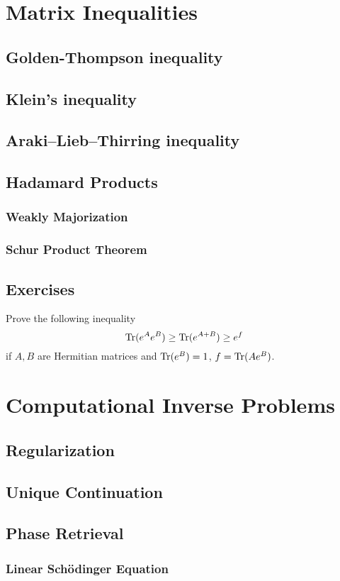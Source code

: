 \chapter{Matrix Inequalities}
\section{Golden-Thompson inequality}
\section{Klein's inequality}
\section{Araki–Lieb–Thirring inequality}
\section{Hadamard Products}
\subsection{Weakly Majorization}
\subsection{Schur Product Theorem}
\section{Exercises}
\begin{problem}
Prove the following inequality 
    \begin{equation*}
        {\textrm{Tr}}(e^A e^B) \ge {\textrm{Tr}}(e^{A + B}) \ge e^f
    \end{equation*}
    if $A, B$ are Hermitian matrices and ${\textrm{Tr}}(e^B) = 1$, $f = {\textrm{Tr}}(A e^B)$.
\end{problem}
\newpage
\chapter{Computational Inverse Problems}
\section{Regularization}
\section{Unique Continuation}
\section{Phase Retrieval}
\subsection{Linear Sch\"{o}dinger Equation}